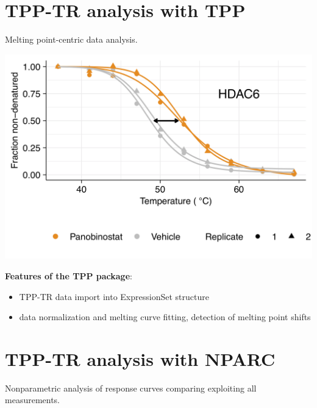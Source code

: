 \documentclass{article}
\newcommand{\hcode}[2][lgray]{{\ttfamily\color{vdgray}\colorbox{#1}{#2}}}
\begin{document}
\begin{multicols}{2}
\noindent
\begin{minipage}[t]{\linewidth}
  \vspace{0.55cm}
  \section*{\huge TPP-TR analysis with \hcode{TPP}}
  Melting point-centric data analysis.
  \begin{center}
  \includegraphics[width=\linewidth]{figs/tpp-tr_example.png}
  \end{center}
  \textbf{Features of the \hcode{TPP} package}:

  \begin{itemize}

  \item TPP-TR data import into ExpressionSet structure
  \item data normalization and melting curve fitting, detection of melting point shifts
  
  \end{itemize}
\end{minipage}

\noindent
\begin{minipage}[t]{\linewidth}
  \vspace{0.55cm}
  \section*{\huge TPP-TR analysis with \hcode{NPARC}}
  Nonparametric analysis of response curves comparing exploiting all measurements. 


\end{minipage}
\end{multicols}
\end{document}
